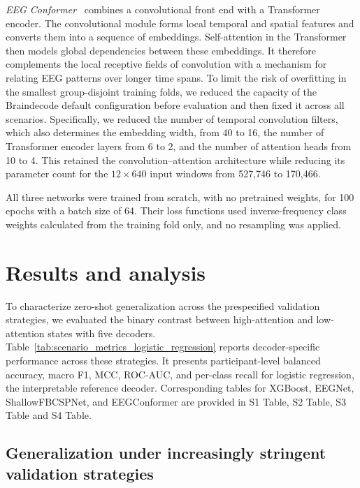\documentclass[10pt,letterpaper]{article}
\newcommand{\rev}[1]{#1}
\begin{document}
\rev{\textit{EEG Conformer}~\cite{song2023conformer} combines a convolutional
front end with a Transformer encoder. The convolutional module forms local
temporal and spatial features and converts them into a sequence of embeddings.
Self-attention in the Transformer then models global dependencies between these
embeddings. It therefore complements the local receptive fields of convolution
with a mechanism for relating EEG patterns over longer time spans. To limit the
risk of overfitting in the smallest group-disjoint training folds, we reduced
the capacity of the Braindecode default configuration before evaluation and
then fixed it across all scenarios. Specifically, we reduced the number of
temporal convolution filters, which also determines the embedding width, from
40 to 16, the number of Transformer encoder layers from 6 to 2, and the number
of attention heads from 10 to 4. This retained the convolution--attention
architecture while reducing its parameter count for the $12 \times 640$ input
windows from 527,746 to 170,466.}

\rev{All three networks were trained from scratch, with no pretrained weights,
for 100 epochs with a batch size of 64. Their loss functions used
inverse-frequency class weights calculated from the training fold only, and no
resampling was applied.}

\section*{Results and analysis}

To characterize zero-shot generalization across the prespecified validation
strategies, we evaluated the binary contrast between high-attention and
low-attention states with five decoders.
Table~\ref{tab:scenario_metrics_logistic_regression} reports decoder-specific
performance across these strategies. It presents
participant-level balanced accuracy, macro F1, MCC, ROC-AUC, and per-class
recall for logistic regression, the interpretable reference decoder.
Corresponding tables for XGBoost, EEGNet, ShallowFBCSPNet, and EEGConformer are
provided in S1 Table, S2 Table, S3 Table and S4 Table.



\subsection*{Generalization under increasingly stringent validation strategies}
\end{document}
